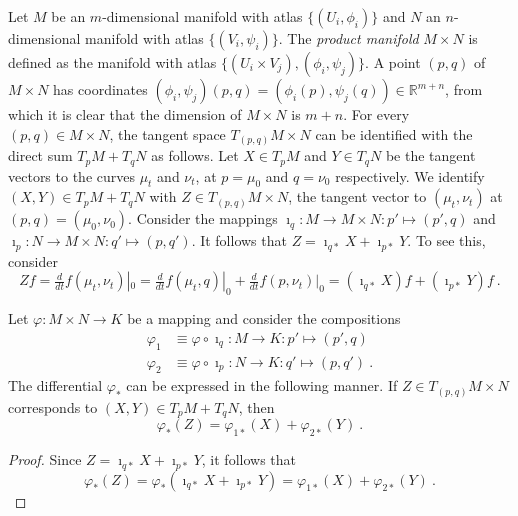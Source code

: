 \documentclass[10pt,reqno]{amsart}
\numberwithin{equation}{section}
\begin{document}
\blankline
Let $M$ be an $m$-dimensional manifold with atlas $\{(U_i, 
\phi_i)\}$ and $N$ an $n$-dimensional manifold with atlas 
$\{(V_i, \psi_i)\}$. The \emph{product manifold} $M \times N$ is 
defined as the manifold with atlas $\{(U_i \times V_j), 
(\phi_i,\psi_j)\}$. A point $(p,q)$ of $M \times N$ has 
coordinates $(\phi_i,\psi_j)(p,q) = (\phi_i(p),\psi_j(q)) \in 
\mathbb{R}^{m+n}$, from which it is clear that the dimension of 
$M \times N$ is $m + n$. For every $(p,q) \in M \times N$, the 
tangent space $T_{(p,q)} M \times N$ can be identified with the 
direct sum $T_p M + T_q N$ as follows. Let $X \in T_p M$ and $Y 
\in T_q N$ be the tangent vectors to the curves $\mu_t$ and 
$\nu_t$, at $p = \mu_0$ and $q = \nu_0$ respectively. We identify 
$(X,Y) \in T_p M + T_q N$ with $Z \in T_{(p,q)} M \times N$, the 
tangent vector to $(\mu_t,\nu_t)$ at $(p,q) = (\mu_0,\nu_0)$.  
Consider the mappings $\imath_q : M \to M \times N : p' \mapsto 
(p',q)$ and $\imath_p : N \to M \times N : q' \mapsto (p,q')$. It 
follows that $Z = \imath_{q\ast}X + \imath_{p\ast}Y$. To see 
this, consider
%
\begin{displaymath}
	Zf = \tfrac{d}{dt}f(\mu_t,\nu_t)|_0 = 
	\tfrac{d}{dt}f(\mu_t,q)|_0 + \tfrac{d}{dt}f(p,\nu_t)|_0 = 
	(\imath_{q\ast}X)f + (\imath_{p\ast}Y)f~.
\end{displaymath}
\begin{proposition}
	Let $\varphi : M \times N \to K$ be a mapping and consider the 
	compositions
	\begin{align*}
		\varphi_1 &\equiv \varphi\circ\imath_q : M \to K : p' 
		\mapsto (p',q) \\
		\varphi_2 &\equiv \varphi\circ\imath_p : N \to K : q' 
		\mapsto (p,q')~.
	\end{align*}
	The differential $\varphi_\ast$ can be expressed in the 
	following manner. If $Z \in T_{(p,q)} M \times N$ corresponds 
	to $(X,Y) \in T_p M + T_q N$, then
	\begin{equation}
		\varphi_\ast(Z) = \varphi_{1\ast}(X) + \varphi_{2\ast}(Y)~.
	\end{equation}
\end{proposition}
\begin{proof}
	Since $Z = \imath_{q\ast}X + \imath_{p\ast}Y$, it follows 
	that
	\begin{displaymath}
		\varphi_\ast(Z) = \varphi_\ast(\imath_{q\ast}X + 
		\imath_{p\ast}Y) = \varphi_{1\ast}(X) + 
		\varphi_{2\ast}(Y)~.
	\end{displaymath}
\end{proof}
\end{document}
